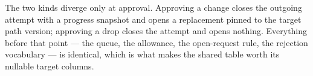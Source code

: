 The two kinds diverge only at approval. Approving a change closes the outgoing attempt with a progress snapshot and opens a replacement pinned to the target path version; approving a drop closes the attempt and opens nothing. Everything before that point --- the queue, the allowance, the open-request rule, the rejection vocabulary --- is identical, which is what makes the shared table worth its nullable target columns.
